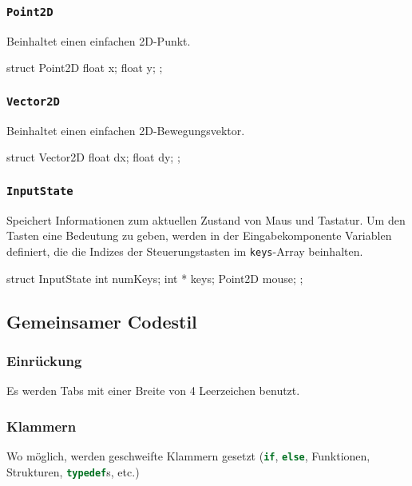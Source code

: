 \documentclass{homework-pp}
\renewcommand{\c}[1]{\lstinline[language=c,basicstyle=\ttfamily]|#1|}
\begin{document}
\subsubsection{\c{Point2D}}

Beinhaltet einen einfachen 2D-Punkt.

\begin{cblock}
struct Point2D {
	float x;
	float y;
};
\end{cblock}

\subsubsection{\c{Vector2D}}

Beinhaltet einen einfachen 2D-Bewegungsvektor.

\begin{cblock}
struct Vector2D {
	float dx;
	float dy;
};
\end{cblock}

\subsubsection{\c{InputState}}

Speichert Informationen zum aktuellen Zustand von Maus und Tastatur. Um den Tasten eine Bedeutung zu geben, werden in der Eingabekomponente Variablen definiert, die die Indizes der Steuerungstasten im \c{keys}-Array beinhalten.

\begin{cblock}
struct InputState {
	int		numKeys;
	int *	keys;
	Point2D	mouse;
};
\end{cblock}

\subsection{Gemeinsamer Codestil}

\subsubsection{Einrückung}

Es werden Tabs mit einer Breite von 4 Leerzeichen benutzt.

\subsubsection{Klammern}

Wo möglich, werden geschweifte Klammern gesetzt (\c{if}, \c{else}, Funktionen, Strukturen, \c{typedef}s, etc.)
\end{document}

